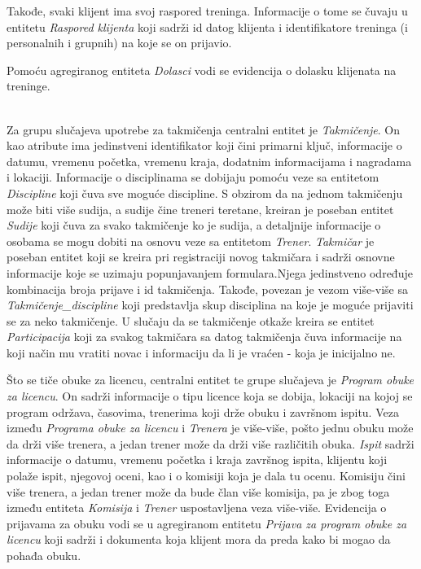 \documentclass[../main.tex]{subfiles}
\begin{document}
Takođe, svaki klijent ima svoj raspored treninga. Informacije o tome se čuvaju u entitetu \textit{Raspored klijenta} koji sadrži id datog klijenta i identifikatore treninga (i personalnih i grupnih) na koje se on prijavio.

Pomoću agregiranog entiteta \textit{Dolasci} vodi se evidencija o dolasku klijenata na treninge.

\\
Za grupu slučajeva upotrebe za takmičenja centralni entitet je \textit{Takmičenje}. On kao atribute ima jedinstveni identifikator koji čini primarni ključ, informacije o datumu, vremenu početka, vremenu kraja, dodatnim informacijama i nagradama i lokaciji. Informacije o disciplinama se dobijaju pomoću veze sa entitetom \textit{Discipline} koji čuva sve moguće discipline. S obzirom da na jednom takmičenju može biti više sudija, a sudije čine treneri teretane, kreiran je poseban entitet \textit{Sudije} koji čuva za svako takmičenje ko je sudija, a detaljnije informacije o osobama se mogu dobiti na osnovu veze sa entitetom \textit{Trener}. \textit{Takmičar} je poseban entitet koji se kreira pri registraciji novog takmičara i sadrži osnovne informacije koje se uzimaju popunjavanjem formulara.Njega jedinstveno određuje kombinacija broja prijave i id takmičenja. Takođe, povezan je vezom više-više sa \textit{Takmičenje\_discipline} koji predstavlja skup disciplina na koje je moguće prijaviti se za neko takmičenje. U slučaju da se takmičenje otkaže kreira se entitet \textit{Participacija} koji za svakog takmičara sa datog takmičenja čuva informacije na koji način mu vratiti novac i informaciju da li je vraćen - koja je inicijalno ne. 

Što se tiče obuke za licencu, centralni entitet te grupe slučajeva je \textit{Program obuke za licencu}. On sadrži informacije o tipu licence koja se dobija, lokaciji na kojoj se program održava, časovima, trenerima koji drže obuku i završnom ispitu. Veza između \textit{Programa obuke za licencu} i \textit{Trenera} je više-više, pošto jednu obuku može da drži više trenera, a jedan trener može da drži više različitih obuka. \textit{Ispit} sadrži informacije o datumu, vremenu početka i kraja završnog ispita, klijentu koji polaže ispit, njegovoj oceni, kao i o komisiji koja je dala tu ocenu. Komisiju čini više trenera, a jedan trener može da bude član više komisija, pa je zbog toga između entiteta \textit{Komisija} i \textit{Trener} uspostavljena veza više-više. Evidencija o prijavama za obuku vodi se u agregiranom entitetu \textit{Prijava za program obuke za licencu} koji sadrži i dokumenta koja klijent mora da preda kako bi mogao da pohađa obuku.
\end{document}

